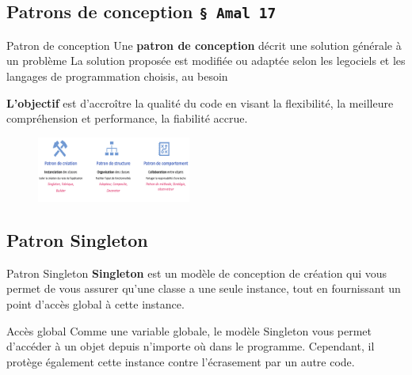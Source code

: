 \documentclass[16pt]{report}
\begin{document}
\begin{multicols*}{2}
        \chapter{Patrons de conception \texttt{\S \; Amal 17}  }


        \begin{Definitionx}{Patron de conception}{}
            Une \textbf{patron de conception} décrit une \textcolor{myb}{solution générale à un problème}  
            La solution proposée est modifiée ou adaptée selon les legociels et les langages de programmation 
            choisis, au besoin
        \end{Definitionx}

        \begin{note}{}{}
            \textbf{L'objectif} est d'accroître la qualité du code en visant la \textcolor{myb}{flexibilité}, 
            la meilleure \textcolor{myb}{compréhension et performance}, \textcolor{myb}{la fiabilité accrue}.    
        \end{note}


        \begin{figure}[H]
            \begin{center}
                \includegraphics[width=0.45\textwidth]{patronTypes.png}
            \end{center}
        \end{figure}


        \section{Patron Singleton}

        \begin{Definitionx}{Patron Singleton}{}
            \textbf{Singleton} est un modèle de conception de création qui vous permet de vous
            assurer qu'une classe a une seule instance, tout en fournissant un \textcolor{myb}{point d'accès
            global} à cette instance.

        \end{Definitionx}   


        \begin{Definitionx}{Accès global}{}
            Comme une variable globale, le modèle Singleton vous permet
            d'accéder à un objet depuis n'importe où dans le programme. Cependant, il
            protège également cette instance contre l'écrasement par un autre code.
        \end{Definitionx}



\end{multicols*}
\end{document}
